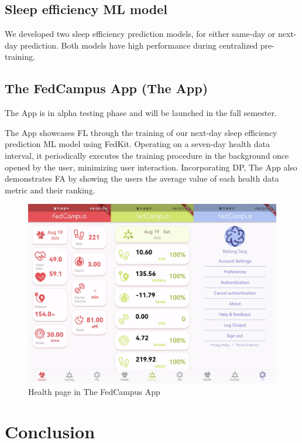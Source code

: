 \documentclass{article}
\begin{document}
\begin{multicols}{2}
\subsection{Sleep efficiency ML model}

We developed two sleep efficiency prediction models, for either same-day
or next-day prediction. Both models have high performance during
centralized pre-training.

\subsection{The FedCampus App (The App)}

The App is in alpha testing phase and will be launched in the fall
semester.

The App showcases FL through the training of our next-day sleep
efficiency prediction ML model using FedKit. Operating on a seven-day
health data interval, it periodically executes the training procedure in
the background once opened by the user, minimizing user interaction.
Incorporating DP, The App also demonstrates FA by showing the users the
average value of each health data metric and their ranking.

\begin{figure}[H]
\centering
\includegraphics[scale=0.1]{fedcampus-app.jpg}
\caption{Health page in The FedCampus App}
\label{fig:app}
\end{figure}

\section{Conclusion}


\end{multicols}
\end{document}
